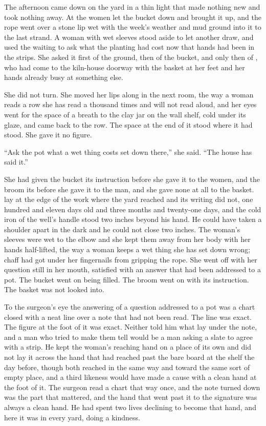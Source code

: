 The afternoon came down on the yard in a thin light that made nothing new and took nothing away. At  the women let the bucket down and brought it up, and the rope went over a stone lip wet with the week's weather and mud ground into it to the last strand. A woman with wet sleeves stood aside to let another draw, and used the waiting to ask what the planting had cost now that hands had been in the strips. She asked it first of the ground, then of the bucket, and only then of , who had come to the kiln-house doorway with the basket at her feet and her hands already busy at something else.

She did not turn. She moved her lips along  in the next room, the way a woman reads a row she has read a thousand times and will not read aloud, and her eyes went for the space of a breath to the clay jar on the wall shelf, cold under its glaze, and came back to the row. The space at the end of it stood where it had stood. She gave it no figure.

“Ask the pot what a wet thing costs set down there,” she said. “The house has said it.”

She had given the bucket its instruction before she gave it to the women, and the broom its before she gave it to the man, and she gave none at all to the basket.  lay at the edge of the work where the yard reached and its writing did not, one hundred and eleven days old and three months and twenty-one days, and the cold iron of the well's handle stood two inches beyond his hand. He could have taken a shoulder apart in the dark and he could not close two inches. The woman's sleeves were wet to the elbow and she kept them away from her body with her hands half-lifted, the way a woman keeps a wet thing she has set down wrong; chaff had got under her fingernails from gripping the rope. She went off with her question still in her mouth, satisfied with an answer that had been addressed to a pot. The bucket went on being filled. The broom went on with its instruction. The basket was not looked into.

To the surgeon's eye the answering of a question addressed to a pot was a chart closed with a neat line over a note that had not been read. The line was exact. The figure at the foot of it was exact. Neither told him what lay under the note, and a man who tried to make them tell would be a man asking a slate to agree with a strip. He kept the woman's reaching hand on a place of its own and did not lay it across the hand that had reached past the bare board at the shelf the day before, though both reached in the same way and toward the same sort of empty place, and a third likeness would have made a cause with a clean hand at the foot of it. The surgeon read a chart that way once, and the note turned down was the part that mattered, and the hand that went past it to the signature was always a clean hand. He had spent two lives declining to become that hand, and here it was in every yard, doing a kindness.

